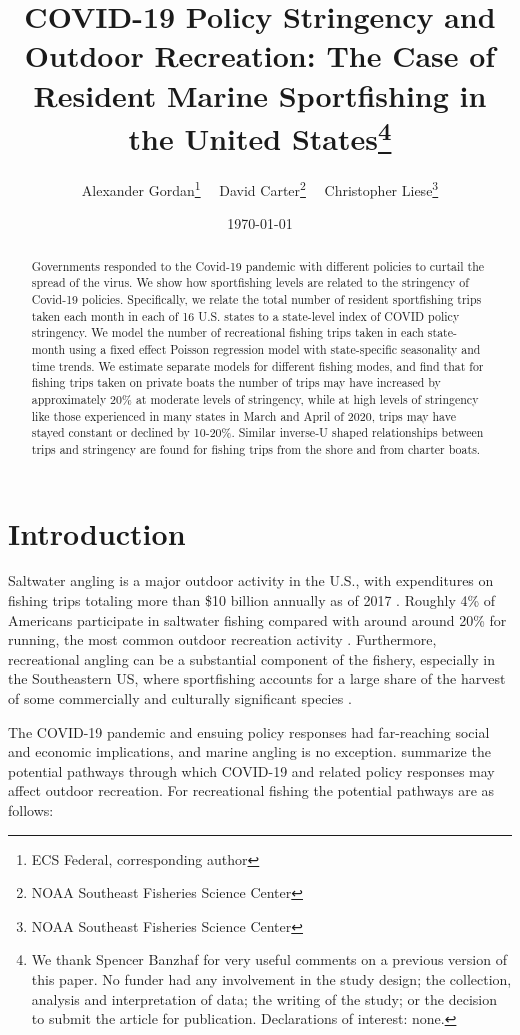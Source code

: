 \documentclass[12pt]{article}
\author{%
Alexander Gordan\thanks{ECS Federal, corresponding author}%
\ \ David Carter\thanks{NOAA Southeast Fisheries Science Center}%
\ \ Christopher Liese\thanks{NOAA Southeast Fisheries Science Center}%

}
\title{\vspace{-2.2cm}\bf{COVID-19 Policy Stringency and Outdoor Recreation: The Case of Resident
Marine Sportfishing in the United States}\footnote{We thank Spencer Banzhaf for very useful comments on a previous version of this paper.  No funder had any involvement in the study design; the collection, analysis and interpretation of data; the writing of the study; or the decision to submit the article for publication. Declarations of interest: none.}}
\begin{document}
\date{\today}
\maketitle
\thispagestyle{empty}

\newpage

\begin{abstract}
\noindent Governments responded to the Covid-19 pandemic with different policies
to curtail the spread of the virus. We show how sportfishing levels are
related to the stringency of Covid-19 policies. Specifically, we relate
the total number of resident sportfishing trips taken each month in each
of 16 U.S. states to a state-level index of COVID policy stringency. We
model the number of recreational fishing trips taken in each state-month
using a fixed effect Poisson regression model with state-specific
seasonality and time trends. We estimate separate models for different
fishing modes, and find that for fishing trips taken on private boats
the number of trips may have increased by approximately 20\% at moderate
levels of stringency, while at high levels of stringency like those
experienced in many states in March and April of 2020, trips may have
stayed constant or declined by 10-20\%. Similar inverse-U shaped
relationships between trips and stringency are found for fishing trips
from the shore and from charter boats.

\vspace{1cm}


\end{abstract}
\newpage{}

\section{Introduction}

Saltwater angling is a major outdoor activity in the U.S., with expenditures on fishing trips totaling more than \$10 billion annually
as of 2017 \citep{lovell2020economic}. Roughly 4\% of Americans participate in saltwater fishing compared with around around 20\% for running, the most common outdoor recreation activity \citep{2019OutdoorReport}.  Furthermore, recreational angling can be a substantial component of the fishery, especially in the Southeastern US, where sportfishing accounts for a large share of the harvest of some commercially and culturally significant species \citep{lewin2019potential}. 

The COVID-19 pandemic and ensuing policy responses had far-reaching social and economic implications, and marine angling is no exception. \citet{landry2021has} summarize the potential pathways through which COVID-19 and related policy responses may affect outdoor recreation. For recreational fishing the potential pathways are as follows:
\end{document}
